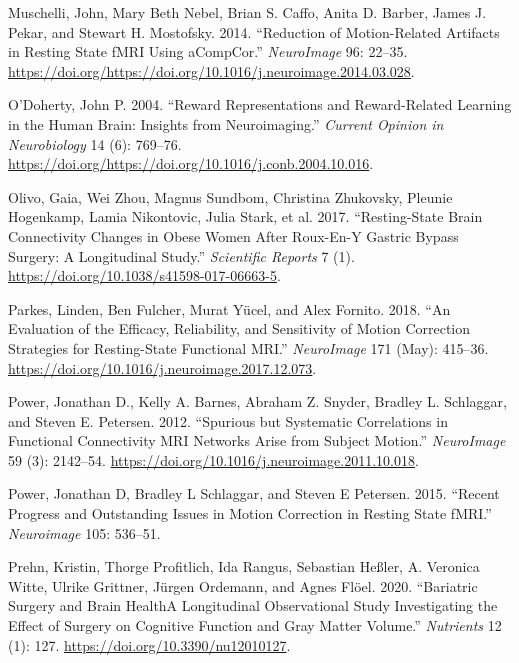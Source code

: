\documentclass[
]{article}
\begin{document}
\leavevmode\hypertarget{ref-Muschelli_2014}{}%
Muschelli, John, Mary Beth Nebel, Brian S. Caffo, Anita D. Barber, James J. Pekar, and Stewart H. Mostofsky. 2014. ``Reduction of Motion-Related Artifacts in Resting State fMRI Using aCompCor.'' \emph{NeuroImage} 96: 22--35. \url{https://doi.org/https://doi.org/10.1016/j.neuroimage.2014.03.028}.

\leavevmode\hypertarget{ref-Odoherty_2004}{}%
O'Doherty, John P. 2004. ``Reward Representations and Reward-Related Learning in the Human Brain: Insights from Neuroimaging.'' \emph{Current Opinion in Neurobiology} 14 (6): 769--76. \url{https://doi.org/https://doi.org/10.1016/j.conb.2004.10.016}.

\leavevmode\hypertarget{ref-Olivo_2017}{}%
Olivo, Gaia, Wei Zhou, Magnus Sundbom, Christina Zhukovsky, Pleunie Hogenkamp, Lamia Nikontovic, Julia Stark, et al. 2017. ``Resting-State Brain Connectivity Changes in Obese Women After Roux-En-Y Gastric Bypass Surgery: A Longitudinal Study.'' \emph{Scientific Reports} 7 (1). \url{https://doi.org/10.1038/s41598-017-06663-5}.

\leavevmode\hypertarget{ref-Parkes_2018}{}%
Parkes, Linden, Ben Fulcher, Murat Yücel, and Alex Fornito. 2018. ``An Evaluation of the Efficacy, Reliability, and Sensitivity of Motion Correction Strategies for Resting-State Functional MRI.'' \emph{NeuroImage} 171 (May): 415--36. \url{https://doi.org/10.1016/j.neuroimage.2017.12.073}.

\leavevmode\hypertarget{ref-Power_2012}{}%
Power, Jonathan D., Kelly A. Barnes, Abraham Z. Snyder, Bradley L. Schlaggar, and Steven E. Petersen. 2012. ``Spurious but Systematic Correlations in Functional Connectivity MRI Networks Arise from Subject Motion.'' \emph{NeuroImage} 59 (3): 2142--54. \url{https://doi.org/10.1016/j.neuroimage.2011.10.018}.

\leavevmode\hypertarget{ref-Power_2015}{}%
Power, Jonathan D, Bradley L Schlaggar, and Steven E Petersen. 2015. ``Recent Progress and Outstanding Issues in Motion Correction in Resting State fMRI.'' \emph{Neuroimage} 105: 536--51.

\leavevmode\hypertarget{ref-Prehn_2020}{}%
Prehn, Kristin, Thorge Profitlich, Ida Rangus, Sebastian Heßler, A. Veronica Witte, Ulrike Grittner, Jürgen Ordemann, and Agnes Flöel. 2020. ``Bariatric Surgery and Brain HealthA Longitudinal Observational Study Investigating the Effect of Surgery on Cognitive Function and Gray Matter Volume.'' \emph{Nutrients} 12 (1): 127. \url{https://doi.org/10.3390/nu12010127}.
\end{document}

